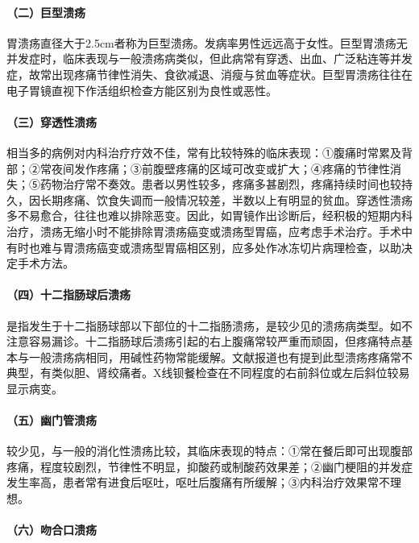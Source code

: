 \paragraph{（二）巨型溃疡}

胃溃疡直径大于2.5cm者称为巨型溃疡。发病率男性远远高于女性。巨型胃溃疡无并发症时，临床表现与一般溃疡病类似，但此病常有穿透、出血、广泛粘连等并发症，故常出现疼痛节律性消失、食欲减退、消瘦与贫血等症状。巨型胃溃疡往往在电子胃镜直视下作活组织检查方能区别为良性或恶性。

\paragraph{（三）穿透性溃疡}

相当多的病例对内科治疗疗效不佳，常有比较特殊的临床表现：①腹痛时常累及背部；②常夜间发作疼痛；③前腹壁疼痛的区域可改变或扩大；④疼痛的节律性消失；⑤药物治疗常不奏效。患者以男性较多，疼痛多甚剧烈，疼痛持续时间也较持久，因长期疼痛、饮食失调而一般情况较差，半数以上有明显的贫血。穿透性溃疡多不易愈合，往往也难以排除恶变。因此，如胃镜作出诊断后，经积极的短期内科治疗，溃疡无缩小时不能排除胃溃疡癌变或溃疡型胃癌，应考虑手术治疗。手术中有时也难与胃溃疡癌变或溃疡型胃癌相区别，应多处作冰冻切片病理检查，以助决定手术方法。

\paragraph{（四）十二指肠球后溃疡}

是指发生于十二指肠球部以下部位的十二指肠溃疡，是较少见的溃疡病类型。如不注意容易漏诊。十二指肠球后溃疡引起的右上腹痛常较严重而顽固，但疼痛特点基本与一般溃疡病相同，用碱性药物常能缓解。文献报道也有提到此型溃疡疼痛常不典型，有类似胆、肾绞痛者。X线钡餐检查在不同程度的右前斜位或左后斜位较易显示病变。

\paragraph{（五）幽门管溃疡}

较少见，与一般的消化性溃疡比较，其临床表现的特点：①常在餐后即可出现腹部疼痛，程度较剧烈，节律性不明显，抑酸药或制酸药效果差；②幽门梗阻的并发症发生率高，患者常有进食后呕吐，呕吐后腹痛有所缓解；③内科治疗效果常不理想。

\paragraph{（六）吻合口溃疡}

